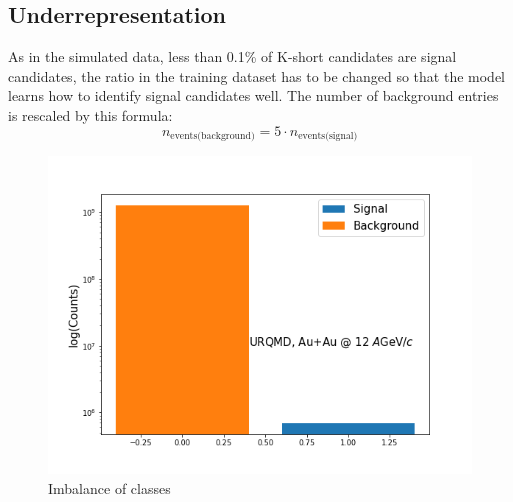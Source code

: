 \documentclass[12pt,a4paper]{report}
\begin{document}
\subsection{Underrepresentation}
As in the simulated data, less than 0.1\% of K-short candidates are signal candidates, the ratio in the training dataset has to be changed so that the model learns how to identify signal candidates well. The number of background entries is rescaled by this formula:
\begin{equation}
    n_\text{events(background)} = 5 \cdot n_\text{events(signal)}
\end{equation}
\begin{figure}[H]
    \centering
    \includegraphics[width=.6\textwidth]{images/inbalance.png}
    \caption{Imbalance of classes}
\end{figure}
\end{document}
